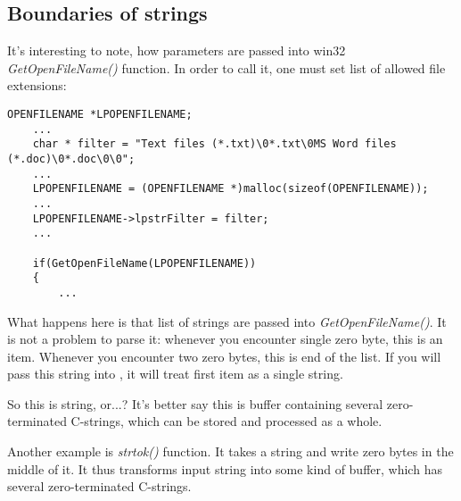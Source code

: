 \subsection{Boundaries of strings}

It's interesting to note, how parameters are passed into win32 \emph{GetOpenFileName()} function.
In order to call it, one must set list of allowed file extensions:

\begin{lstlisting}[style=customc]
	OPENFILENAME *LPOPENFILENAME;
	...
	char * filter = "Text files (*.txt)\0*.txt\0MS Word files (*.doc)\0*.doc\0\0";
	...
	LPOPENFILENAME = (OPENFILENAME *)malloc(sizeof(OPENFILENAME));
	...
	LPOPENFILENAME->lpstrFilter = filter;
	...

	if(GetOpenFileName(LPOPENFILENAME))
	{
		...
\end{lstlisting}

What happens here is that list of strings are passed into \emph{GetOpenFileName()}.
It is not a problem to parse it: whenever you encounter single zero byte, this is an item.
Whenever you encounter two zero bytes, this is end of the list.
If you will pass this string into \printf, it will treat first item as a single string.

So this is string, or...?
It's better say this is buffer containing several zero-terminated C-strings, which can be stored and processed
as a whole.

Another example is \emph{strtok()} function. It takes a string and write zero bytes in the middle of it.
It thus transforms input string into some kind of buffer, which has several zero-terminated C-strings.

